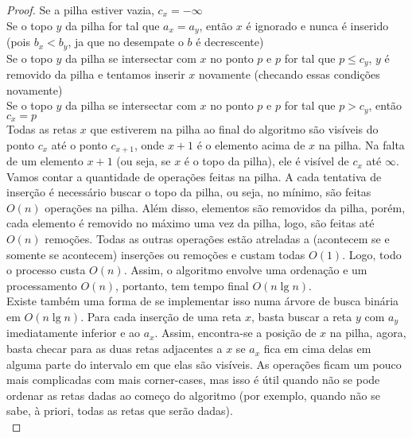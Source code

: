\documentclass[12pt]{article}
\begin{document}
\begin{proof}
Se a pilha estiver vazia, $c_x = -\infty$ \\
Se o topo $y$ da pilha for tal que $a_x = a_y$, então $x$ é ignorado e nunca é inserido (pois $b_x < b_y$, ja que no desempate o $b$ é decrescente) \\
Se o topo $y$ da pilha se intersectar com $x$ no ponto $p$ e $p$ for tal que $p \leq c_y$, $y$ é removido da pilha e tentamos inserir $x$ novamente (checando essas condições novamente) \\
Se o topo $y$ da pilha se intersectar com $x$ no ponto $p$ e $p$ for tal que $p > c_y$, então $c_x = p$ \\
Todas as retas $x$ que estiverem na pilha ao final do algoritmo são visíveis do ponto $c_x$ até o ponto $c_{x+1}$, onde $x+1$ é o elemento acima de $x$ na pilha. Na falta de um elemento $x+1$ (ou seja, se $x$ é o topo da pilha), ele é visível de $c_x$ até $\infty$. \\
Vamos contar a quantidade de operações feitas na pilha. A cada tentativa de inserção é necessário buscar o topo da pilha, ou seja, no mínimo, são feitas $O(n)$ operações na pilha. Além disso, elementos são removidos da pilha, porém, cada elemento é removido no máximo uma vez da pilha, logo, são feitas até $O(n)$ remoções. Todas as outras operações estão atreladas a (acontecem se e somente se acontecem) inserções ou remoções e custam todas $O(1)$. Logo, todo o processo custa $O(n)$. Assim, o algoritmo envolve uma ordenação e um processamento $O(n)$, portanto, tem tempo final $O(n \lg n)$. \\
Existe também uma forma de se implementar isso numa árvore de busca binária em $O(n \lg n)$. Para cada inserção de uma reta $x$, basta buscar a reta $y$ com $a_y$ imediatamente inferior e ao $a_x$. Assim, encontra-se a posição de $x$ na pilha, agora, basta checar para as duas retas adjacentes a $x$ se $a_x$ fica em cima delas em alguma parte do intervalo em que elas são visíveis. As operações ficam um pouco mais complicadas com mais corner-cases, mas isso é útil quando não se pode ordenar as retas dadas ao começo do algoritmo (por exemplo, quando não se sabe, à priori, todas as retas que serão dadas). \\
\end{proof}
\end{document}
